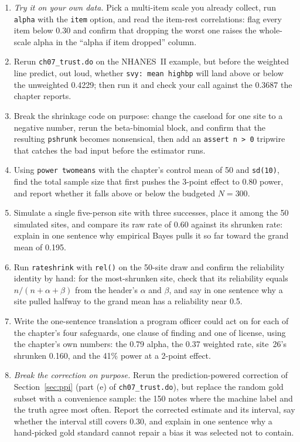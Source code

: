 \begin{enumerate}
  \item \emph{Try it on your own data.} Pick a multi-item scale you already collect, run \texttt{alpha} with the \texttt{item} option, and read the item-rest correlations: flag every item below 0.30 and confirm that dropping the worst one raises the whole-scale alpha in the \enquote{alpha if item dropped} column.
  \item Rerun \texttt{ch07\_trust.do} on the NHANES~II example, but before the weighted line predict, out loud, whether \texttt{svy: mean highbp} will land above or below the unweighted 0.4229; then run it and check your call against the 0.3687 the chapter reports.
  \item Break the shrinkage code on purpose: change the caseload for one site to a negative number, rerun the beta-binomial block, and confirm that the resulting \texttt{pshrunk} becomes nonsensical, then add an \texttt{assert n > 0} tripwire that catches the bad input before the estimator runs.
  \item Using \texttt{power twomeans} with the chapter's control mean of 50 and \texttt{sd(10)}, find the total sample size that first pushes the 3-point effect to 0.80 power, and report whether it falls above or below the budgeted $N=300$.
  \item Simulate a single five-person site with three successes, place it among the 50 simulated sites, and compare its raw rate of 0.60 against its shrunken rate: explain in one sentence why empirical Bayes pulls it so far toward the grand mean of 0.195.
  \item Run \texttt{rateshrink} with \texttt{rel()} on the 50-site draw and confirm the reliability identity by hand: for the most-shrunken site, check that its reliability equals $n/(n+\alpha+\beta)$ from the header's $\alpha$ and $\beta$, and say in one sentence why a site pulled halfway to the grand mean has a reliability near 0.5.
  \item Write the one-sentence translation a program officer could act on for each of the chapter's four safeguards, one clause of finding and one of license, using the chapter's own numbers: the 0.79 alpha, the 0.37 weighted rate, site~26's shrunken 0.160, and the 41\% power at a 2-point effect.
  \item \emph{Break the correction on purpose.} Rerun the prediction-powered correction of Section~\ref{sec:ppi} (part (e) of \texttt{ch07\_trust.do}), but replace the random gold subset with a convenience sample: the 150 notes where the machine label and the truth agree most often. Report the corrected estimate and its interval, say whether the interval still covers 0.30, and explain in one sentence why a hand-picked gold standard cannot repair a bias it was selected not to contain.
\end{enumerate}
